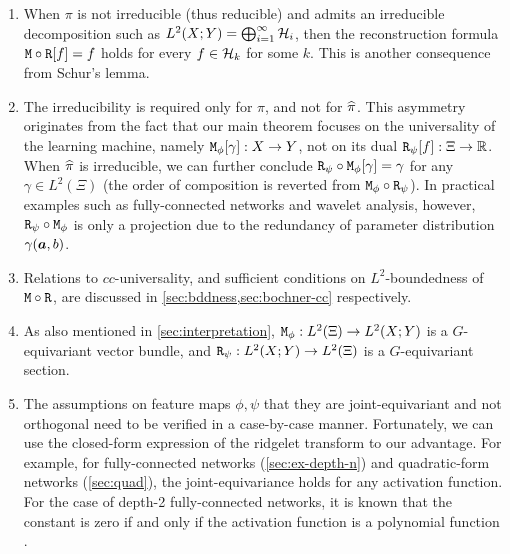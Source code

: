 \begin{remark}
\begin{enumerate}
\item When $\pi$ is not irreducible (thus reducible) and admits an irreducible decomposition such as $L^2(X;Y) = \bigoplus_{i=1}^\infty \calH_i$, then the reconstruction formula $\lm \circ \ridge[f] = f$ holds for every $f \in \calH_k$ for some $k$. This is another consequence from Schur's lemma.
\item The irreducibility is required only for $\pi$, and not for $\pihat$. This asymmetry originates from the fact that our main theorem focuses on the universality of the learning machine, namely $\lm_\phi[\gamma]:X \to Y$, not on its dual $\ridge_\psi[f]:\Xi \to \RR$. When $\pihat$ is irreducible, we can further conclude $\ridge_\psi \circ \lm_\phi[\gamma] = \gamma$ for any $\gamma \in L^2(\Xi)$ (the order of composition is reverted from $\lm_\phi \circ \ridge_\psi$). In practical examples such as fully-connected networks and wavelet analysis, however, $\ridge_\psi \circ \lm_\phi$ is only a projection due to the redundancy of parameter distribution $\gamma(\aa,b)$.
\item Relations to $cc$-universality, and sufficient conditions on $L^2$-boundedness of $\lm \circ \ridge$, are discussed in \cref{sec:bddness,sec:bochner-cc} respectively.
\item %
As also mentioned in \cref{sec:interpretation}, $\lm_\phi : L^2(\Xi) \to L^2(X;Y)$ is a $G$-equivariant vector bundle, and $\ridge_\psi : L^2(X;Y) \to L^2(\Xi)$ is a $G$-equivariant section.
\item
The assumptions on feature maps $\phi,\psi$ that they are joint-equivariant and not orthogonal need to be verified in a case-by-case manner. Fortunately, we can use the closed-form expression of the ridgelet transform to our advantage.
    For example, for fully-connected networks (\cref{sec:ex-depth-n}) and quadratic-form networks (\cref{sec:quad}), the joint-equivariance holds for any activation function.
    For the case of depth-2 fully-connected networks, it is known that the constant is zero if and only if the activation function is a polynomial function \citep[see e.g.,][]{Sonoda2015acha}.
\end{enumerate}
\end{remark}

